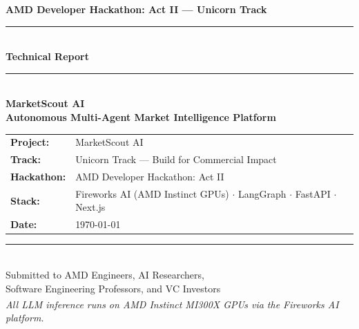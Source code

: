 \documentclass[12pt,a4paper,oneside]{book}
\begin{document}
\frontmatter

\begin{titlepage}
\centering
\vspace*{0.8cm}

{\large\bfseries\color{blue!70}
  AMD Developer Hackathon: Act II — Unicorn Track}\\[0.3cm]
{\color{gray}\rule{14cm}{0.4pt}}\\[0.5cm]

{\Large\bfseries\color{black!80} Technical Report}\\[0.5cm]
{\color{gray}\rule{14cm}{0.5pt}}\\[0.5cm]

{\Huge\bfseries MarketScout AI}\\[0.25cm]
{\LARGE\bfseries Autonomous Multi-Agent Market Intelligence Platform}\\[0.6cm]


\vspace{0.7cm}

\begin{tabular}{ll}
  \textbf{Project:}     & MarketScout AI \\[2pt]
  \textbf{Track:}       & Unicorn Track — Build for Commercial Impact \\[2pt]
  \textbf{Hackathon:}   & AMD Developer Hackathon: Act II \\[2pt]
  \textbf{Stack:}       & Fireworks AI (AMD Instinct GPUs) $\cdot$ LangGraph $\cdot$ FastAPI $\cdot$ Next.js \\[2pt]
  \textbf{Date:}        & \today \\
\end{tabular}

\vspace{0.6cm}
{\color{gray}\rule{14cm}{0.4pt}}\\[0.3cm]
{\small\color{gray}
  Submitted to AMD Engineers, AI Researchers,\\
  Software Engineering Professors, and VC Investors\\[0.2cm]
  \textit{All LLM inference runs on AMD Instinct\textsuperscript{\textregistered}
  MI300X GPUs via the Fireworks AI platform.}
}
\end{titlepage}
\end{document}
